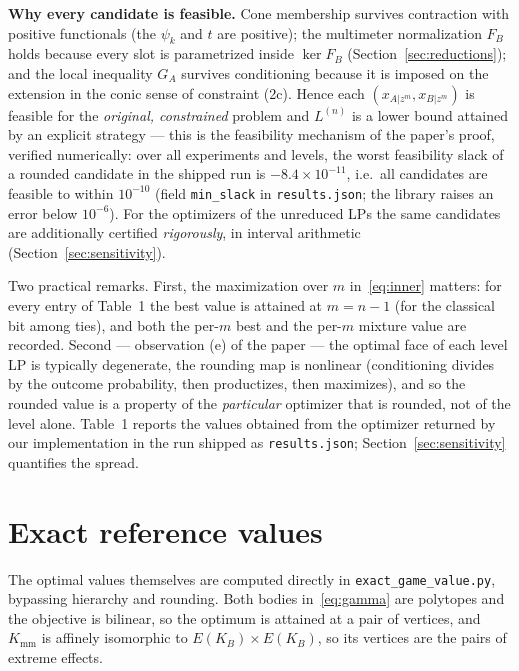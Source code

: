 \documentclass[11pt,a4paper]{article}
\newcommand*{\lrbracket}[1]{\left(#1\right)}
\newcommand*{\Kmm}{K_{\mathrm{mm}}}
\newcommand*{\code}[1]{\texttt{#1}}
\theoremstyle{remark}
\begin{document}
\noindent
\textbf{Why every candidate is feasible.} Cone membership survives
contraction with positive functionals (the $\psi_k$ and $t$ are positive);
the multimeter normalization $F_B$ holds because every slot is
parametrized inside $\ker F_B$ (Section~\ref{sec:reductions}); and the
local inequality $G_A$ survives conditioning because it is imposed on the
extension in the conic sense of constraint (2c). Hence each
$\lrbracket{x_{A\vert z^m}, x_{B\vert z^m}}$ is feasible for the
\emph{original, constrained} problem and $L^{(n)}$ is a lower bound
attained by an explicit strategy --- this is the feasibility mechanism of
the paper's proof, verified numerically: over all experiments and levels,
the worst feasibility slack of a rounded candidate in the shipped run is
$-8.4\times 10^{-11}$, i.e.\ all candidates are feasible to within
$10^{-10}$ (field \code{min\_slack} in \code{results.json}; the library
raises an error below $10^{-6}$). For the optimizers of the unreduced LPs
the same candidates are additionally certified \emph{rigorously}, in
interval arithmetic (Section~\ref{sec:sensitivity}).

Two practical remarks. First, the maximization over $m$
in~\eqref{eq:inner} matters: for every entry of Table~1 the best value is
attained at $m=n-1$ (for the classical bit among ties), and both the per-$m$
best and the per-$m$ mixture value are recorded. Second --- observation (e)
of the paper --- the optimal face of each level LP is typically degenerate,
the rounding map is nonlinear (conditioning divides by the outcome
probability, then productizes, then maximizes), and so the rounded value is
a property of the \emph{particular} optimizer that is rounded, not of the
level alone. Table~1 reports the values obtained from the optimizer
returned by our implementation in the run shipped as \code{results.json};
Section~\ref{sec:sensitivity} quantifies the spread.

\section{Exact reference values}\label{sec:exact}

The optimal values themselves are computed directly in
\code{exact\_game\_value.py}, bypassing hierarchy and rounding. Both bodies
in~\eqref{eq:gamma} are polytopes and the objective is bilinear, so the
optimum is attained at a pair of vertices, and $\Kmm$ is affinely
isomorphic to $E(K_B)\times E(K_B)$, so its vertices are the pairs of
extreme effects.
\end{document}
